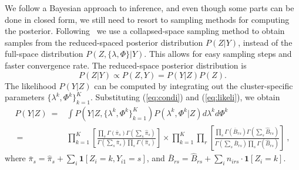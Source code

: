 We follow a Bayesian approach to inference, and even though some parts can be done in closed form, we still need to resort to sampling methods for computing the posterior.  Following~\cite{moises}  we use a collapsed-space sampling method \cite{neal2000markov,collapsed_escobar} to obtain samples from the reduced-spaced posterior distribution $P(Z|Y)$, instead of the full-space distribution $P(Z, \{\lambda, \Phi\} | Y)$. This allows for easy sampling steps and faster convergence rate. 
The reduced-space posterior distribution is
\begin{equation*}
 P(Z|Y) \propto P(Z, Y) = P(Y|Z) P(Z).
\end{equation*}
The likelihood $P(Y|Z)$ can be computed by integrating out the cluster-specific parameters $\{\lambda^k, \Phi^k\}_{k=1}^K$.
Substituting  (\ref{eq:condi}) and (\ref{eq:likeli}), we obtain
\begin{equation*}
\renewcommand*{\arraystretch}{1.9}
\begin{array}{rl}
     P(Y|Z) 
~ = & \int  P(Y| Z, \{\lambda^k, \Phi^k \}_{k=1}^K) P(\lambda^k, \Phi^k | Z) d\lambda^k d\Phi^{k} \\
~ = & \displaystyle{ \prod_{k=1}^K 
      \left[ 
      \frac{\prod_s \Gamma(\bar \pi_s) \Gamma (\sum_s \hat \pi_s)}
           {\Gamma\left( \sum_s \bar \pi_s \right) \prod_s \Gamma (\hat \pi_s)}
      \right]  } \times
    \displaystyle{ \prod_{k=1}^K \prod_r 
      \left[ 
      \frac{\prod_s \Gamma(\bar B_{rs}) \Gamma (\sum_s \hat B_{rs})}
           {\Gamma\left( \sum_s \bar  B_{rs} \right) \prod_s \Gamma (\hat B_{rs})}
      \right] } ~,
\end{array}
\end{equation*}
where
$\bar \pi _s = \hat \pi_s + \sum_{i} \mathbf{1}[Z_i=k,Y_{i1} = s]$, and
$\bar B_{rs} = \hat B_{rs} + \sum_{i} n_{irs}  \cdot \mathbf{1}[Z_i=k]$.

